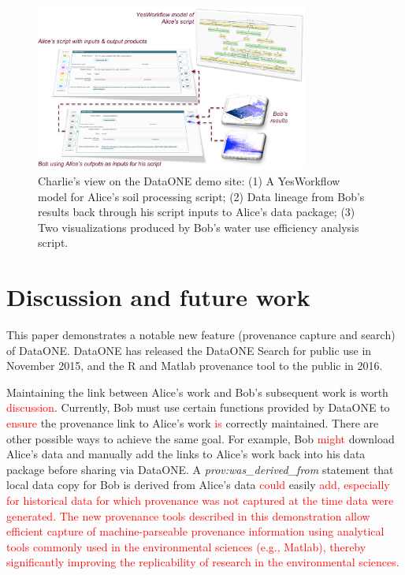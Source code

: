\documentclass[a4paper]{llncs}
\begin{document}
\begin{figure}[t]
\centering   
\includegraphics[width=0.8\textwidth]{figs/abc-crop}
\caption{Charlie's view on the DataONE demo site: (1) A YesWorkflow model for Alice's soil processing script; (2) Data lineage from Bob's results back through his script inputs to Alice's data package; (3) Two visualizations produced by Bob's water use efficiency analysis script.}
\label{fig2}
\end{figure}


\section{Discussion and future work}

This paper demonstrates a notable new feature (provenance capture and search) of DataONE. DataONE has released the DataONE Search for public use in November 2015, and the R and Matlab provenance tool to the public in 2016. 

Maintaining the link between Alice's work and Bob's subsequent work is worth \textcolor{red}{discussion}. Currently, Bob must use certain functions provided by DataONE to \textcolor{red}{ensure} the provenance link to Alice's work \textcolor{red}{is} correctly maintained. There are other possible ways to achieve the same goal. For example,  Bob \textcolor{red}{might} download Alice's data and manually add the links to Alice's work back into his data package before sharing via DataONE. A \emph{prov:was\_derived\_from} statement that local data copy for Bob is derived from Alice's data \textcolor{red}{could} easily \textcolor{red}{add, especially for historical data for which provenance was not captured at the time data were generated.  The new provenance tools described in this demonstration allow efficient capture of machine-parseable provenance information using analytical tools commonly used in the environmental sciences (e.g., Matlab), thereby significantly improving the replicability of research in the environmental sciences.}
\end{document}
